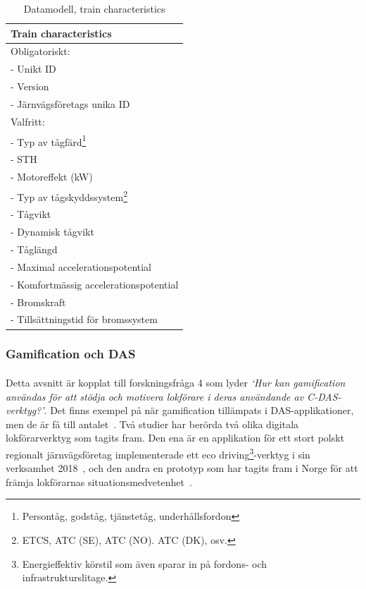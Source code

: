\begin{table}
    \centering
    \begin{tabular}{|l|}
        \hline
        \textbf{Train characteristics} \\
        \hline
        Obligatoriskt: \\
        - Unikt ID \\
        - Version \\
        - Järnvägsföretags unika ID \\
        \hline
        Valfritt: \\
        - Typ av tågfärd\footnote{Persontåg, godståg, tjänstetåg, underhållsfordon} \\
        - STH \\
        - Motoreffekt (kW) \\
        - Typ av tågskyddssystem\footnote{ETCS, ATC (SE), ATC (NO). ATC (DK), osv.} \\
        - Tågvikt \\
        - Dynamisk tågvikt \\
        - Tåglängd \\
        - Maximal accelerationspotential \\
        - Komfortmässig accelerationspotential \\
        - Bromskraft \\
        - Tillsättningstid för bromssystem \\
        \hline
    \end{tabular}
    \caption{Datamodell, train characteristics}
    \label{tab:tc}
\end{table}
\subsubsection{Gamification och DAS}
\paragraph{}
\hspace{-11pt}
Detta avsnitt är kopplat till forskningsfråga 4 som lyder \emph{\lq{}Hur kan gamification användas för att stödja och motivera lokförare i deras användande av C-DAS-verktyg?\rq{}}.
Det finns exempel på när gamification tillämpats i DAS-applikationer, men de är få till antalet~\cite{Bae2014, Cwil2018}.
Två studier har berörda två olika digitala lokförarverktyg som tagits fram.
Den ena är en applikation för ett stort polskt regionalt järnvägsföretag implementerade ett eco driving\footnote{Energieffektiv körstil som även sparar in på fordons- och infrastrukturslitage.}-verktyg i sin verksamhet 2018~\cite{Cwil2018}, och den andra en prototyp som har tagits fram i Norge för att främja lokförarnas situationsmedvetenhet~\cite{Bae2014}.
